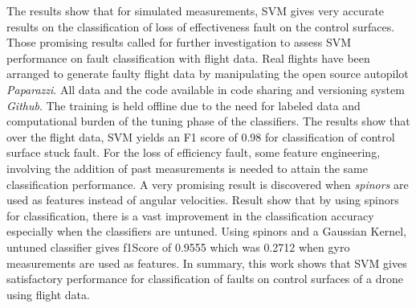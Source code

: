 The results show that for simulated measurements, SVM gives very accurate results on the classification of loss of effectiveness fault on the control surfaces. 
Those promising results called for further investigation to assess SVM performance on fault classification with flight data.
Real flights have been arranged to generate faulty flight data by manipulating the open source autopilot \emph{Paparazzi}. 
All data and the code available in code sharing and versioning system \emph{Github}. 
The training is held offline due to the need for labeled data and computational burden of the tuning phase of the classifiers. 
The results show that over the flight data, SVM yields an F1 score of 0.98 for classification of control surface stuck fault. 
For the loss of efficiency fault, some feature engineering, involving the addition of past measurements is needed to attain the same classification performance. 
A very promising result is discovered when \emph{spinors} are used as features instead of angular velocities. 
Result show that by using spinors for classification, there is a vast improvement in the classification accuracy especially when the classifiers are untuned. Using spinors and a Gaussian Kernel, untuned classifier gives f1Score of 0.9555 which was 0.2712 when gyro measurements are used as features.
In summary, this work shows that SVM gives satisfactory performance for classification of faults on control surfaces of a drone using flight data.